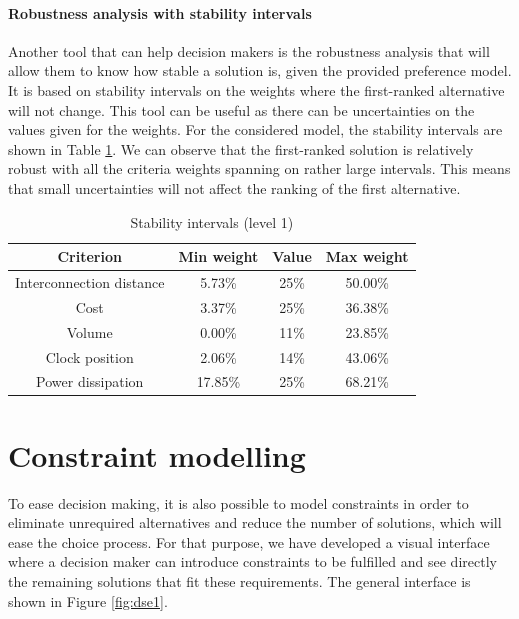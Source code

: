 \paragraph{Robustness analysis with stability intervals}
Another tool that can help decision makers is the robustness analysis that will allow them to know how stable a solution is, given the provided preference model. It is based on stability intervals on the weights where the first-ranked alternative will not change. This tool can be useful as there can be uncertainties on the values given for the weights. For the considered model, the stability intervals are shown in Table \ref{tab:stability}. We can observe that the first-ranked solution is relatively robust with all the criteria weights spanning on rather large intervals. This means that small uncertainties will not affect the ranking of the first alternative.

\begin{table}[h!]
\caption{Stability intervals (level 1)}
\begin{center}
\begin{tabular}{|c|c|c|c|}
\hline
Criterion & Min weight & Value  & Max weight \\
\hline
Interconnection distance & 5.73\% & 25\% & 50.00\% \\
Cost & 3.37\% & 25\% & 36.38\% \\
Volume & 0.00\% & 11\% & 23.85\% \\
Clock position & 2.06\% & 14\% & 43.06\% \\
Power dissipation & 17.85\% & 25\% & 68.21\% \\
\hline
\end{tabular}
\end{center}
\label{tab:stability}
\end{table}

\section{Constraint modelling}
To ease decision making, it is also possible to model constraints in order to eliminate unrequired alternatives and reduce the number of solutions, which will ease the choice process. For that purpose, we have developed a visual interface where a decision maker can introduce constraints to be fulfilled and see directly the remaining solutions that fit these requirements. The general interface is shown in Figure \ref{fig:dse1}.


